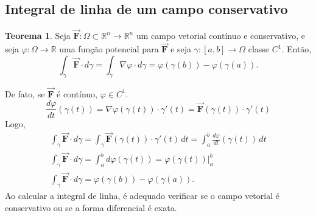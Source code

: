 \documentclass[11pt]{article}
\theoremstyle{definition}
\newtheorem{teorema}{Teorema}
\begin{document}
	\subsection{Integral de linha de um campo conservativo}
	
	\begin{teorema}
		Seja $\vec{\boldsymbol{F}}:\Omega\subset \mathbb{R}^n\to \mathbb{R}^n$ um campo vetorial contínuo e conservativo, e seja $\varphi:\Omega\to \mathbb{R}$ uma função potencial para $\vec{\boldsymbol{F}}$ e seja $\gamma:[a,b]\to \Omega$ classe $C^1$. Então,
		\begin{equation*}
			\int_{\gamma}\vec{\boldsymbol{F}}\cdot d\gamma=\int_{\gamma}\nabla \varphi\cdot d\gamma=\varphi(\gamma(b))-\varphi(\gamma(a)).
		\end{equation*}
	\end{teorema}

	De fato, se $\vec{\boldsymbol{F}}$ é contínuo, $\varphi\in C^1$.
	\begin{equation*}
		\frac{d\varphi}{dt}(\gamma(t))=\nabla\varphi(\gamma(t))\cdot \gamma'(t)=\vec{\boldsymbol{F}}(\gamma(t))\cdot \gamma'(t)
	\end{equation*}
	Logo,
	\begin{gather*}
		\int_{\gamma}\vec{\boldsymbol{F}}\cdot d\gamma=\int_{\gamma}\vec{\boldsymbol{F}}(\gamma(t))\cdot \gamma'(t)\, dt=\int_{a}^{b}\frac{d\varphi}{dt}(\gamma(t))\, dt\\
		\int_{\gamma}\vec{\boldsymbol{F}}\cdot d\gamma=\int_{a}^{b}d\varphi(\gamma(t))=\varphi(\gamma(t))\Big|_{a}^{b}\\
		\int_{\gamma}\vec{\boldsymbol{F}}\cdot d\gamma=\varphi(\gamma(b))-\varphi(\gamma(a)).
	\end{gather*}
	Ao calcular a integral de linha, é adequado verificar se o campo vetorial é conservativo ou se a forma diferencial é exata.
	
\end{document}
